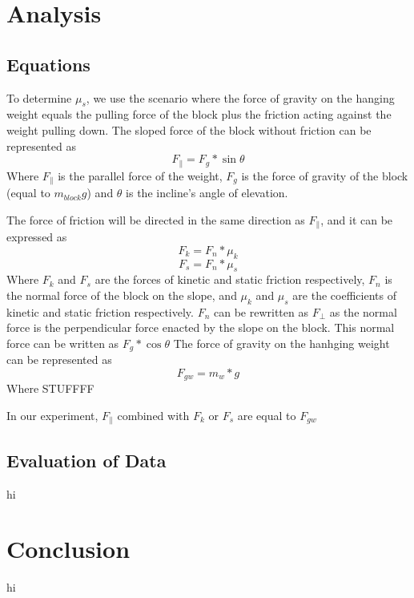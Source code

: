 \documentclass[12pt]{article}
\begin{document}
    \section{Analysis}
        \subsection{Equations}
            \par To determine $\mu_s$, we use the scenario where the force of
            gravity on the hanging weight equals the pulling force of the
            block plus the friction acting against the weight pulling down.
            The sloped force of the block without friction can be represented
            as
            \begin{equation}
                F_{\parallel} = F_g * \sin{\theta}
            \end{equation}
            Where $F_{\parallel}$ is the parallel force of the weight, $F_g$
            is the force of gravity of the block (equal to $m_{block}g$) and
            $\theta$ is the incline's angle of elevation.

            \par The force of friction will be directed in the same direction
            as $F_{\parallel}$, and it can be expressed as
            \begin{equation}
                F_k = F_n * \mu_k
            \end{equation}
            \begin{equation}
                F_s = F_n * \mu_s
            \end{equation}
            Where $F_k$ and $F_s$ are the forces of kinetic and static friction
            respectively, $F_n$ is the normal force of the block on the slope,
            and $\mu_k$ and $\mu_s$ are the coefficients of kinetic and static
            friction respectively. $F_n$ can be rewritten as $F_{\bot}$
            as the normal force is the perpendicular force enacted by the slope
            on the block. This normal force can be written as $F_g *\cos{\theta}$
            The force of gravity on the hanhging weight can be represented as
            \begin{equation}
                F_{gw} = m_w * g
            \end{equation}
            Where STUFFFF
            \par In our experiment, $F_{\parallel}$ combined with $F_k$ or $F_s$
            are equal to $F_{gw}$
        \subsection{Evaluation of Data}
            hi
    \section{Conclusion}
        hi
\end{document}
